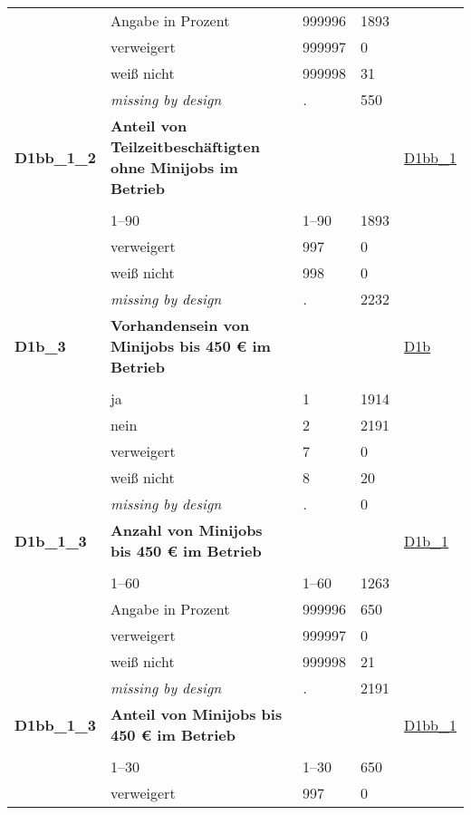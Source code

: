 \begin{longtable}{| L{2.65cm} | L{8cm} | C{1.5cm} | R{1.25cm} | C{2.25cm}  |}
   & Angabe in Prozent & 999996 & 1893 &  \\ 
   & verweigert & 999997 & 0 &  \\ 
   & weiß nicht & 999998 & 31 &  \\ 
   & \textit{missing by design} & \textit{.} & 550 &  \\ 
   \midrule
\textbf{D1bb\_1\_2}\label{var:D1bb:1:2} & \textbf{Anteil von Teilzeitbeschäftigten ohne Minijobs im Betrieb} &  &  & \hyperref[D1bb:1]{D1bb\_1} \\ 
   &  &  &  &  \\ 
   & 1--90 & 1--90 & 1893 &  \\ 
   & verweigert & 997 & 0 &  \\ 
   & weiß nicht & 998 & 0 &  \\ 
   & \textit{missing by design} & \textit{.} & 2232 &  \\ 
   \midrule
\textbf{D1b\_3}\label{var:D1b:3} & \textbf{Vorhandensein von Minijobs bis 450 € im Betrieb} &  &  & \hyperref[D1b]{D1b} \\ 
   &  &  &  &  \\ 
   & ja & 1 & 1914 &  \\ 
   & nein & 2 & 2191 &  \\ 
   & verweigert & 7 & 0 &  \\ 
   & weiß nicht & 8 & 20 &  \\ 
   & \textit{missing by design} & \textit{.} & 0 &  \\ 
   \midrule
\textbf{D1b\_1\_3}\label{var:D1b:1:3} & \textbf{Anzahl von Minijobs bis 450 € im Betrieb} &  &  & \hyperref[D1b:1]{D1b\_1} \\ 
   &  &  &  &  \\ 
   & 1--60 & 1--60 & 1263 &  \\ 
   & Angabe in Prozent & 999996 & 650 &  \\ 
   & verweigert & 999997 & 0 &  \\ 
   & weiß nicht & 999998 & 21 &  \\ 
   & \textit{missing by design} & \textit{.} & 2191 &  \\ 
   \midrule
\textbf{D1bb\_1\_3}\label{var:D1bb:1:3} & \textbf{Anteil von Minijobs bis 450 € im Betrieb} &  &  & \hyperref[D1bb:1]{D1bb\_1} \\ 
   &  &  &  &  \\ 
   & 1--30 & 1--30 & 650 &  \\ 
   & verweigert & 997 & 0 &  \\ 

\end{longtable}
